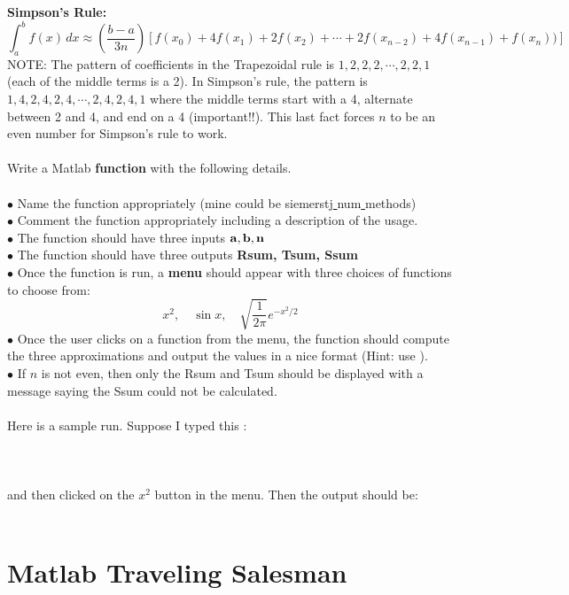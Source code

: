 \textbf{Simpson's Rule:}
\[
\int_a^b f(x) \, dx
\approx
\left(\frac{b-a}{3n}\right) 
\left[
f(x_0) + 4f(x_1) + 2f(x_2) + \cdots + 2f(x_{n-2}) + 4f(x_{n-1})+f(x_n))
\right]
\]
NOTE:  The pattern of coefficients in the Trapezoidal rule is 
$1,2,2,2,\cdots, 2, 2, 1$ (each of the middle terms is a 2). In Simpson's rule, the pattern is
$1,4,2,4,2,4,\cdots,2,4,2,4,1$ where the middle terms start with a 4, alternate between 2 and 4, and end on a 4 (important!!).  This last fact forces $n$ to be an even number for Simpson's rule to work.\\

\\

Write a Matlab \textbf{function} with the following details.\\
\\
$\bullet$ Name the function appropriately (mine could be siemerstj\underline{ }num\underline{ }methods)\\
$\bullet$ Comment the function appropriately including a description of the usage.\\
$\bullet$ The function should have three inputs ${\bf a, b, n}$ \\
$\bullet$ The function should have three outputs \textbf{Rsum, Tsum, Ssum}\\
$\bullet$ Once the function is run, a \textbf{menu} should appear with three choices of functions to choose from:
\[
x^2, \quad \sin x, \quad \sqrt{\frac{1}{2\pi}} e^{-x^2/2}
\]
$\bullet$ Once the user clicks on a function from the menu, the function should compute the three approximations and output the values in a nice format (Hint: use ).\\
$\bullet$ If $n$ is not even, then only the Rsum and Tsum should be displayed with a message saying the Ssum could not be calculated.\\
\\
Here is a sample run.  Suppose I typed this :\\
\\
\\
\\
and then clicked on the $x^2$ button in the menu. Then the output should be:\\
\\

\section{Matlab Traveling Salesman}\label{sec:Matlab_travelingsalesman}

